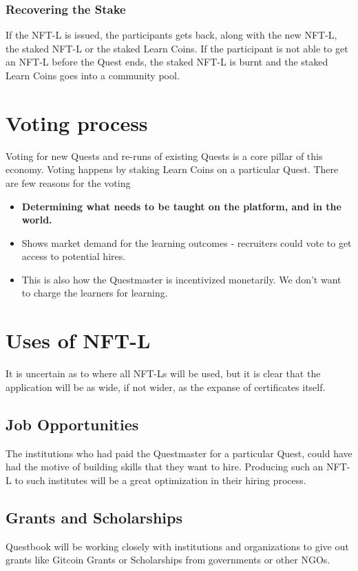 \documentclass{article}
\begin{document}
        \subsubsection{Recovering the Stake}
          If the NFT-L is issued, the participants gets back, along with the new NFT-L, the staked NFT-L or the staked Learn Coins.
          \break
          If the participant is not able to get an NFT-L before the Quest ends, the staked NFT-L is burnt and the staked Learn Coins goes into a community pool.
  \section{Voting process}
    Voting for new Quests and re-runs of existing Quests is a core pillar of this economy. 
    Voting happens by staking Learn Coins on a particular Quest.
    There are few reasons for the voting
    \begin{itemize}
      \item \textbf{Determining what needs to be taught on the platform, and in the world.}
      \item Shows market demand for the learning outcomes - recruiters could vote to get access to potential hires.
      \item This is also how the Questmaster is incentivized monetarily. We don't want to charge the learners for learning.
    \end{itemize}
  \section{Uses of NFT-L}
    It is uncertain as to where all NFT-Ls will be used, but it is clear that the application will be as wide, if not wider, as the expanse of certificates itself.
    \subsection{Job Opportunities}
      The institutions who had paid the Questmaster for a particular Quest, could have had the motive of building skills that they want to hire. Producing such an NFT-L to such institutes will be a great optimization in their hiring process.
    \subsection{Grants and Scholarships}
      Questbook will be working closely with institutions and organizations to give out grants like Gitcoin Grants or Scholarships from governments or other NGOs.
\end{document}
